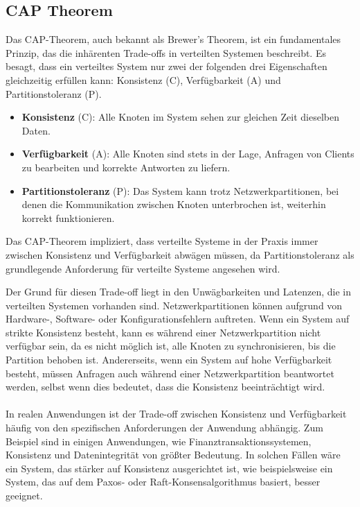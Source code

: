 \documentclass[../vs-script-first-v01.tex]{subfiles}
\begin{document}
\subsection{CAP Theorem}
Das CAP-Theorem, auch bekannt als Brewer's Theorem, ist ein fundamentales Prinzip, das die inhärenten Trade-offs in verteilten Systemen beschreibt. Es besagt, dass ein verteiltes System nur zwei der folgenden drei Eigenschaften gleichzeitig erfüllen kann: Konsistenz (C), Verfügbarkeit (A) und Partitionstoleranz (P).
\begin{itemize}
\item \textbf{Konsistenz} (C): Alle Knoten im System sehen zur gleichen Zeit dieselben Daten.
\item \textbf{Verfügbarkeit} (A): Alle Knoten sind stets in der Lage, Anfragen von Clients zu bearbeiten und korrekte Antworten zu liefern.
\item \textbf{Partitionstoleranz} (P): Das System kann trotz Netzwerkpartitionen, bei denen die Kommunikation zwischen Knoten unterbrochen ist, weiterhin korrekt funktionieren.
\end{itemize}

Das CAP-Theorem impliziert, dass verteilte Systeme in der Praxis immer zwischen Konsistenz und Verfügbarkeit abwägen müssen, da Partitionstoleranz als grundlegende Anforderung für verteilte Systeme angesehen wird.

Der Grund für diesen Trade-off liegt in den Unwägbarkeiten und Latenzen, die in verteilten Systemen vorhanden sind. Netzwerkpartitionen können aufgrund von Hardware-, Software- oder Konfigurationsfehlern auftreten. Wenn ein System auf strikte Konsistenz besteht, kann es während einer Netzwerkpartition nicht verfügbar sein, da es nicht möglich ist, alle Knoten zu synchronisieren, bis die Partition behoben ist. Andererseits, wenn ein System auf hohe Verfügbarkeit besteht, müssen Anfragen auch während einer Netzwerkpartition beantwortet werden, selbst wenn dies bedeutet, dass die Konsistenz beeinträchtigt wird.
\\\\
In realen Anwendungen ist der Trade-off zwischen Konsistenz und Verfügbarkeit häufig von den spezifischen Anforderungen der Anwendung abhängig. Zum Beispiel sind in einigen Anwendungen, wie Finanztransaktionssystemen, Konsistenz und Datenintegrität von größter Bedeutung. In solchen Fällen wäre ein System, das stärker auf Konsistenz ausgerichtet ist, wie beispielsweise ein System, das auf dem Paxos- oder Raft-Konsensalgorithmus basiert, besser geeignet.
\end{document}
